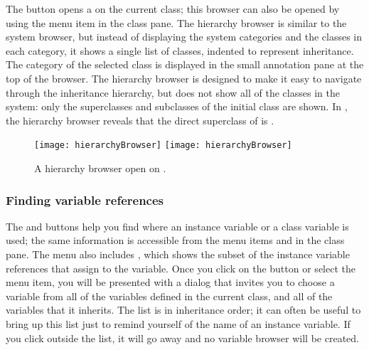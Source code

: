 \documentclass[a4paper,10pt,twoside]{book}
\begin{document}
The  button opens a  on the current class; this
browser can also be opened by using the  menu item in the class pane.
The hierarchy browser is similar to the system browser, but instead of displaying the system categories and the classes in each category, it shows a single list of classes, indented to represent inheritance.
The category of the selected class is displayed in the small annotation pane at the top of the browser.
The hierarchy browser is designed to make it easy to navigate through the inheritance hierarchy, but does not show all of the classes in the system: only the superclasses and subclasses of the initial class are shown.
In , the hierarchy browser reveals that the direct superclass of  is .

\begin{figure}[btp]
	\begin{center}
	\ifluluelse
		{\texttt{[image: hierarchyBrowser]}}
		{\texttt{[image: hierarchyBrowser]}}
	\end{center}
	\caption{A hierarchy browser open on .}
	\label{fig:hierarchyBrowser}
\end{figure}

\subsubsection{Finding variable references}
\label{sec:variables}

The  and  buttons help you find where an instance variable or a class variable is used; the same information is accessible from the  menu items  and  in the class pane.  
The menu also includes , which shows the subset of the instance variable references that assign to the variable. 
Once you click on the button or select the menu item, you will be presented with a dialog that invites you to choose a variable from all of the variables defined in the current class, and all of the variables that it inherits.  The list is in inheritance order; it can often be useful to bring up this list just to remind yourself of the name of an instance variable.  If you click outside the list, it will go away and no variable browser will be created.
\end{document}
